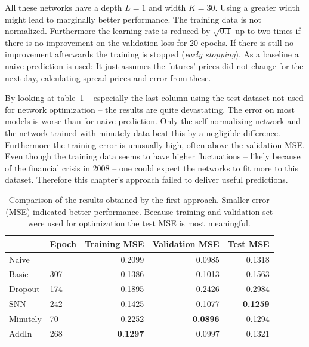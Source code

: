 All these networks have a depth $L=1$ and width $K=30$. Using a greater width might lead to marginally better performance. The training data is not normalized. Furthermore the learning rate is reduced by $\sqrt{0.1}$ up to two times if there is no improvement on the validation loss for 20 epochs. If there is still no improvement afterwards the training is stopped (\emph{early stopping}). As a baseline a naive prediction is used: It just assumes the futures' prices did not change for the next day, calculating spread prices and error from these.

By looking at table~\ref{tab:aao-comparison} -- especially the last column using the test dataset not used for network optimization -- the results are quite devastating. The error on most models is worse than for naive prediction. Only the self-normalizing network and the network trained with minutely data beat this by a negligible difference. Furthermore the training error is unusually high, often above the validation MSE. Even though the training data seems to have higher fluctuations -- likely because of the financial crisis in 2008 -- one could expect the networks to fit more to this dataset. Therefore this chapter's approach failed to deliver useful predictions.

\begin{table}
	\centering
	\caption[Comparison of the results obtained by the first approach]{Comparison of the results obtained by the first approach. Smaller error (MSE) indicated better performance. Because training and validation set were used for optimization the test MSE is most meaningful.}
	\begin{tabular}{llrrr}
		\toprule
		{} & Epoch &  Training MSE &  Validation MSE &  \textbf{Test MSE} \\
		\midrule
		Naive    &       &        0.2099 &          0.0985 &    0.1318 \\
		Basic    &   307 &        0.1386 &          0.1013 &    0.1563 \\
		Dropout  &   174 &        0.1895 &          0.2426 &    0.2984 \\
		SNN      &   242 &        0.1425 &          0.1077 &    \textbf{0.1259} \\
		Minutely &    70 &        0.2252 &          \textbf{0.0896} &    0.1294 \\
		AddIn    &   268 &        \textbf{0.1297} &          0.0997 &    0.1321 \\
		\bottomrule
	\end{tabular}
	\label{tab:aao-comparison}
\end{table}